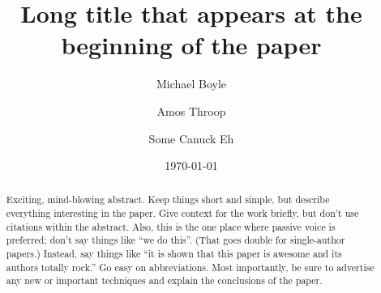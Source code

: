 \documentclass[reprint, aps, prd, letterpaper, noshowpacs, amsmath, %
amssymb, amsfonts, nofootinbib, floatfix, superscriptaddress, %
twoside]{revtex4-1}
\begin{document}

\graphicspath{%
  {Plots/}%
}

\title[Short title appearing in subsequent headers] {Long title that
  appears at the beginning of the paper}

\makeatletter
\@booleantrue\frontmatterverbose@sw
\makeatother

\author{Michael Boyle} \Cornell
\author{Amos Throop} \Caltech
\author{Some Canuck Eh} \CITA

\date{\today}

\begin{abstract}
  Exciting, mind-blowing abstract.  Keep things short and simple, but
  describe everything interesting in the paper.  Give context for the
  work briefly, but don't use citations within the abstract.  Also,
  this is the one place where passive voice is preferred; don't say
  things like ``we do this''.  (That goes double for single-author
  papers.)  Instead, say things like ``it is shown that this paper is
  awesome and its authors totally rock.''  Go easy on abbreviations.
  Most importantly, be sure to advertise any new or important
  techniques and explain the conclusions of the paper.
\end{abstract}



\maketitle

\end{document}

